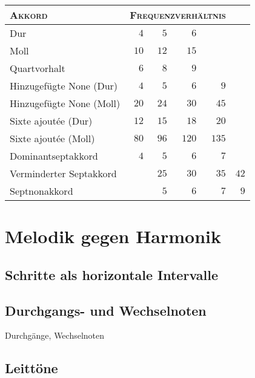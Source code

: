 \documentclass[british,11pt]{scrartcl}
\begin{document}
\begin{table}
  \centering
  \begin{tabular}{lrrrrr}
    \toprule
    \textsc{Akkord} & \multicolumn{4}{l}{\textsc{Frequenzverhältnis}}\\
    \midrule
    Dur                         & $4$  & $5$  & $6$\\
    Moll                        & $10$ & $12$ & $15$\\
    Quartvorhalt                & $6$  & $8$  & $9$\\
    Hinzugefügte None (Dur)     & $4$  & $5$  & $6$  & $9$\\
    Hinzugefügte None (Moll)    & $20$ & $24$ & $30$ & $45$\\
    Sixte ajoutée (Dur)         & $12$ & $15$ & $18$ & $20$\\
    Sixte ajoutée (Moll)        & $80$ & $96$ & $120$ & $135$\\
    Dominantseptakkord          & $4$  & $5$  & $6$  & $7$\\
    Verminderter Septakkord     &      & $25$ & $30$ & $35$ & $42$\\
    Septnonakkord               &      & $5$  & $6$  & $7$  & $9$\\
    \bottomrule
  \end{tabular}
\end{table}

\section{Melodik gegen Harmonik}

\subsection{Schritte als horizontale Intervalle}

\subsection{Durchgangs- und Wechselnoten}

Durchgänge, Wechselnoten

\subsection{Leittöne}
\label{sec:ln}
\end{document}
